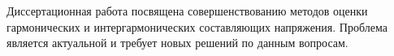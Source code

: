 
{\actuality} 
Диссертационная работа посвящена совершенствованию методов оценки гармонических и интергармонических составляющих напряжения. Проблема является актуальной и требует новых решений по данным вопросам.

%
%
%
%
%
%
%
%

